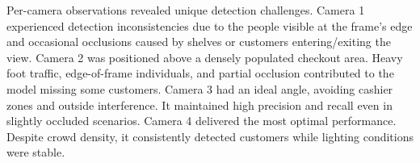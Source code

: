 {\begin{table}[H]
	\begin{doublespace}
		\centering
		\caption[YOLOv10x Model Accuracy based on the Elements of a Confusion Matrix]{\newline \newline YOLOv10x Model Accuracy based on the Elements of a Confusion Matrix}
	\end{doublespace}
\end{table}

Per-camera observations revealed unique detection challenges. Camera 1 experienced detection inconsistencies due to the people visible at the frame’s edge and occasional occlusions caused by shelves or customers entering/exiting the view. Camera 2 was positioned above a densely populated checkout area. Heavy foot traffic, edge-of-frame individuals, and partial occlusion contributed to the model missing some customers. Camera 3 had an ideal angle, avoiding cashier zones and outside interference. It maintained high precision and recall even in slightly occluded scenarios. Camera 4 delivered the most optimal performance. Despite crowd density, it consistently detected customers while lighting conditions were stable.

}

